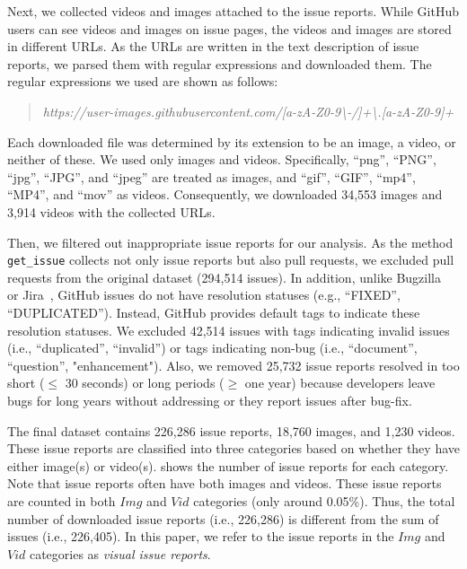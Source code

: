 Next, we collected videos and images attached to the issue reports. While GitHub users can see videos and images on issue pages, the videos and images are stored in different URLs. As the URLs are written in the text description of issue reports, we parsed them with regular expressions and downloaded them. The regular expressions we used are shown as follows:
\begin{quote}
\addtolength\leftmargini{0in}
{\it https://user-images.githubusercontent.com/[a-zA-Z0-9\textbackslash-/]+\textbackslash.[a-zA-Z0-9]+}
\end{quote}
Each downloaded file was determined by its extension to be an image, a video, or neither of these. We used only images and videos. Specifically, ``png'', ``PNG'', ``jpg'', ``JPG'', and ``jpeg'' are treated as images, and  ``gif'', ``GIF'', ``mp4'', ``MP4'', and ``mov'' as videos. 
Consequently, we downloaded 34,553 images and 3,914 videos with the collected URLs. 

Then, we filtered out inappropriate issue reports for our analysis. As the method \texttt{get\_issue} collects not only issue reports but also pull requests, we excluded pull requests from the original dataset (294,514 issues).  
In addition, unlike Bugzilla~\citep{Bugzilla} or Jira~\citep{JIRA}, GitHub issues do not have resolution statuses (e.g., ``FIXED'', ``DUPLICATED''). 
Instead,  GitHub provides default tags to indicate these resolution statuses. 
We excluded 42,514 issues with tags indicating invalid issues (i.e., ``duplicated'', ``invalid'') or tags indicating non-bug (i.e., ``document'', ``question'', "enhancement"). Also, we removed 25,732 issue reports resolved in too short ($\leq$ 30 seconds) or long periods  ($\geq$ one year) because developers leave bugs for long years without addressing or they report issues after bug-fix. 


 The final dataset contains 226,286 issue reports,  18,760 images, and 1,230 videos. 
These issue reports are classified into three categories based on whether they have either image(s) or video(s). 
 shows the number of issue reports for each category. 
Note that issue reports often have both images and videos. 
These issue reports are counted in both $Img$ and $Vid$ categories (only around 0.05\%). 
Thus, the total number of downloaded issue reports (i.e., 226,286) is different from the sum of issues (i.e., 226,405). 
In this paper, we refer to the issue reports in the $Img$ and $Vid$ categories
as \textit{visual issue reports}. 

